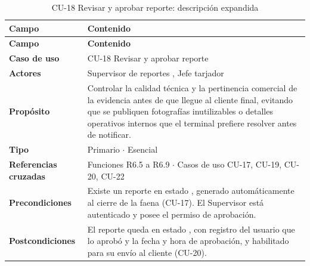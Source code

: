 {\estilotabla
\begin{longtable}{L{0.25\textwidth} L{0.69\textwidth}}

\caption{CU-18 Revisar y aprobar reporte: descripción expandida}
\label{tab:cu18_desc}
\\

\toprule
\textbf{Campo} & \textbf{Contenido} \\
\midrule
\endfirsthead

\toprule
\textbf{Campo} & \textbf{Contenido} \\
\midrule
\endhead

\textbf{Caso de uso} & CU-18 Revisar y aprobar reporte \\
\midrule
\textbf{Actores} & Supervisor de reportes , Jefe tarjador  \\
\midrule
\textbf{Propósito} & Controlar la calidad técnica y la pertinencia comercial de la evidencia antes
de que llegue al cliente final, evitando que se publiquen fotografías inutilizables o detalles
operativos internos que el terminal prefiere resolver antes de notificar. \\
\midrule
\textbf{Tipo} & Primario $\cdot$ Esencial \\
\midrule
\textbf{Referencias cruzadas} & Funciones R6.5 a R6.9 $\cdot$ Casos de uso CU-17, CU-19, CU-20,
CU-22 \\
\midrule
\textbf{Precondiciones} & Existe un reporte en estado , generado automáticamente
al cierre de la faena (CU-17). El Supervisor está autenticado y posee el permiso de aprobación. \\
\midrule
\textbf{Postcondiciones} & El reporte queda en estado , con registro del usuario
que lo aprobó y la fecha y hora de aprobación, y habilitado para su envío al cliente (CU-20). \\

\bottomrule

\end{longtable}
}

